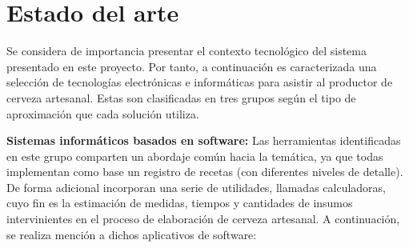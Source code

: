 \section{Estado del arte}
    \par
    Se considera de importancia presentar el contexto tecnológico del sistema presentado en este proyecto. Por tanto, a continuación es caracterizada una selección de tecnologías electrónicas e informáticas para asistir al productor de cerveza artesanal. Estas son clasificadas en tres grupos según el tipo de aproximación que cada solución utiliza.
    \par
    \textbf{Sistemas informáticos basados en software:} Las herramientas identificadas en este grupo comparten un abordaje común hacia la temática, ya que todas implementan como base un registro de recetas (con diferentes niveles de detalle). De forma adicional incorporan una serie de utilidades, llamadas calculadoras, cuyo fin es la estimación de medidas, tiempos y cantidades de insumos intervinientes en el proceso de elaboración de cerveza artesanal. A continuación, se realiza mención a dichos aplicativos de software:
